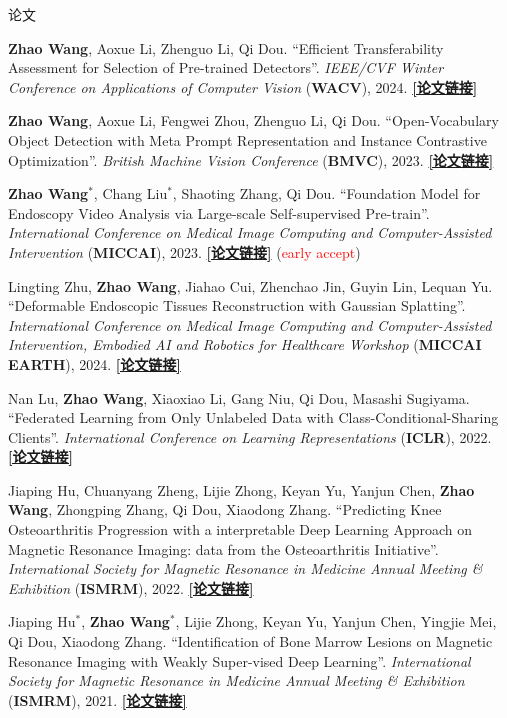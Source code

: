 \documentclass[a4paper]{resume} %
\newcommand{\hl}[1]{\textcolor{red}{#1}}
\begin{document}
\begin{rSection}{论文}
\begin{enumerate}[label={[C\arabic*]}, topsep=0em, leftmargin=1.2em, itemsep=-0.5em]
	\item {\bf Zhao Wang}, Aoxue Li, Zhenguo Li, Qi Dou. “Efficient Transferability Assessment for Selection of Pre-trained Detectors”. {\it IEEE/CVF Winter Conference on Applications of Computer Vision} ({\bf WACV}), 2024. \href{https://arxiv.org/abs/2403.09432}{\bf [论文链接]}
	
	\item {\bf Zhao Wang}, Aoxue Li, Fengwei Zhou, Zhenguo Li, Qi Dou. “Open-Vocabulary Object Detection with Meta Prompt Representation and Instance Contrastive Optimization”. {\it British Machine Vision Conference} ({\bf BMVC}), 2023. \href{https://arxiv.org/abs/2403.09433}{\bf [论文链接]}
	
	\item {\bf Zhao Wang}$^*$, Chang Liu$^*$, Shaoting Zhang, Qi Dou. “Foundation Model for Endoscopy Video Analysis via Large-scale Self-supervised Pre-train”. {\it International Conference on Medical Image Computing and Computer-Assisted Intervention} ({\bf MICCAI}), 2023. \href{https://arxiv.org/abs/2306.16741}{\bf [论文链接]} (\hl{early accept})
	\item Lingting Zhu, {\bf Zhao Wang}, Jiahao Cui, Zhenchao Jin, Guyin Lin, Lequan Yu. “Deformable Endoscopic Tissues Reconstruction with Gaussian Splatting”. {\it International Conference on Medical Image Computing and Computer-Assisted Intervention, Embodied AI and Robotics for Healthcare Workshop} ({\bf MICCAI EARTH}), 2024. \href{https://arxiv.org/abs/2401.11535}{\bf [论文链接]}
	
	\item Nan Lu, {\bf Zhao Wang}, Xiaoxiao Li, Gang Niu, Qi Dou, Masashi Sugiyama. “Federated Learning from Only Unlabeled Data with Class-Conditional-Sharing Clients”. {\it International Conference on Learning Representations} ({\bf ICLR}), 2022. \href{https://openreview.net/forum?id=WHA8009laxu}{\bf [论文链接]}
	
	\item Jiaping Hu, Chuanyang Zheng, Lijie Zhong, Keyan Yu, Yanjun Chen, {\bf Zhao Wang}, Zhongping Zhang, Qi Dou, Xiaodong Zhang. “Predicting Knee Osteoarthritis Progression with a interpretable Deep Learning Approach on Magnetic Resonance Imaging: data from the Osteoarthritis Initiative”. {\it International Society for Magnetic Resonance in Medicine Annual Meeting \& Exhibition} ({\bf ISMRM}), 2022. \href{https://archive.ismrm.org/2022/3102.html}{\bf [论文链接]}
	
   	\item Jiaping Hu$^*$, {\bf Zhao Wang$^*$}, Lijie Zhong, Keyan Yu, Yanjun Chen, Yingjie Mei, Qi Dou, Xiaodong Zhang. “Identification of Bone Marrow Lesions on Magnetic Resonance Imaging with Weakly Super-\allowbreak vised  Deep Learning”. {\it International Society for Magnetic Resonance in Medicine Annual Meeting \& Exhibition} ({\bf ISMRM}), 2021. \href{https://archive.ismrm.org/2021/4062.html}{\bf [论文链接]}
   	

\end{enumerate}
\end{rSection}
\end{document}
